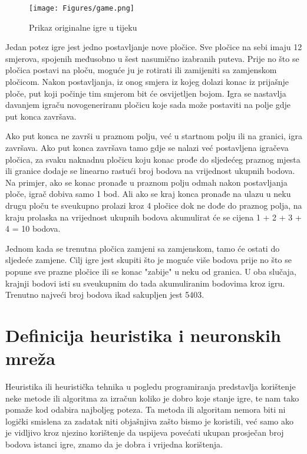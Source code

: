 \documentclass[zavrsnirad]{fer}
\begin{document}
\begin{figure}[htb]
	\centering
	\texttt{[image: Figures/game.png]} 
	\caption{Prikaz originalne igre u tijeku}
	\label{slk:game_screen}
\end{figure}

Jedan potez igre jest jedno postavljanje nove pločice. Sve pločice na sebi imaju 12 smjerova, spojenih međusobno u šest nasumično izabranih puteva. Prije no što se pločica postavi na ploču, moguće ju je rotirati ili zamijeniti sa zamjenskom pločicom. Nakon postavljanja, iz onog smjera iz kojeg dolazi konac iz prijašnje ploče, put koji počinje tim smjerom bit će osvijetljen bojom. Igra se nastavlja davanjem igraču novogeneriranu pločicu koje sada može postaviti na polje gdje put konca završava.

Ako put konca ne završi u praznom polju, već u startnom polju ili na granici, igra završava. Ako put konca završava tamo gdje se nalazi već postavljena igračeva pločica, za svaku naknadnu pločicu koju konac prođe do sljedećeg praznog mjesta ili granice dodaje se linearno rastući broj bodova na vrijednost ukupnih bodova. Na primjer, ako se konac pronađe u praznom polju odmah nakon postavljanja ploče, igrač dobiva samo 1 bod. Ali ako se kraj konca pronađe na ulazu u neku drugu ploču te sveukupno prolazi kroz 4 pločice dok ne dođe do praznog polja, na kraju prolaska na vrijednost ukupnih bodova akumulirat će se cijena 1 + 2 + 3 + 4 = 10 bodova.

Jednom kada se trenutna pločica zamjeni sa zamjenskom, tamo će ostati do sljedeće zamjene. Cilj igre jest skupiti što je moguće više bodova prije no što se popune sve prazne pločice ili se konac "zabije" u neku od granica. U oba slučaja, krajnji bodovi isti su sveukupnim do tada akumuliranim bodovima kroz igru. Trenutno najveći broj bodova ikad sakupljen jest 5403.

\section{Definicija heuristika i neuronskih mreža}
\label{pog:opis_heuristika_i_neuronskih}


Heuristika ili heuristička tehnika u pogledu programiranja predstavlja korištenje neke metode ili algoritma za izračun koliko je dobro koje stanje igre, te nam tako pomaže kod odabira najboljeg poteza. Ta metoda ili algoritam nemora biti ni logički smislena za zadatak niti objašnjiva zašto bismo je koristili, već samo ako je vidljivo kroz njezino korištenje da uspijeva povećati ukupan prosječan broj bodova istanci igre, znamo da je dobra i vrijedna korištenja.
\end{document}
